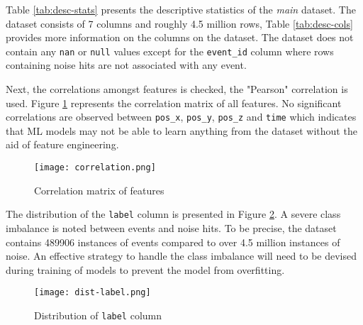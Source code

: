 Table \ref{tab:desc-stats} presents the descriptive statistics of the
\emph{main} dataset. The dataset consists of 7 columns and roughly 4.5 million
rows, Table \ref{tab:desc-cols} provides more information on the columns on the
dataset. The dataset does not contain any \texttt{nan} or \texttt{null} values
except for the \texttt{event\_id} column where rows containing noise hits are
not associated with any event.

Next, the correlations amongst features is checked, the "Pearson" correlation
is used. Figure \ref{fig:corr} represents the correlation matrix of all
features. No significant correlations are observed between \texttt{pos\_x},
\texttt{pos\_y}, \texttt{pos\_z} and \texttt{time} which indicates that ML
models may not be able to learn anything from the dataset without the aid of
feature engineering.

\begin{figure}[h]
  \centering
  \texttt{[image: correlation.png]}
  \caption{Correlation matrix of features}%
  \label{fig:corr}
\end{figure}

The distribution of the \texttt{label} column is presented in Figure \ref{fig:dist-label}. A severe class imbalance is noted between events and noise hits. To be precise, the dataset contains 489906 instances of events compared to over 4.5 million instances of noise. An effective strategy to handle the class imbalance will need to be devised during training of models to prevent the model from overfitting.

\begin{figure}[h]
  \centering
  \texttt{[image: dist-label.png]}
  \caption{Distribution of \texttt{label} column}%
  \label{fig:dist-label}
\end{figure}



